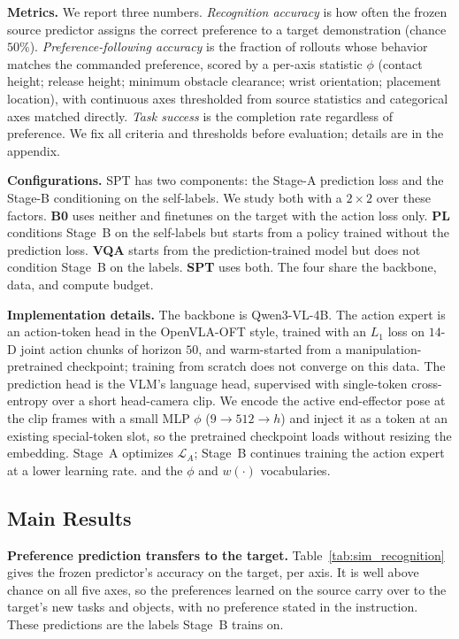 \documentclass{article}
\begin{document}
\textbf{Metrics.}
We report three numbers. \emph{Recognition accuracy} is how often the frozen
source predictor assigns the correct preference to a target demonstration
(chance $50\%$). \emph{Preference-following accuracy} is the fraction of rollouts
whose behavior matches the commanded preference, scored by a per-axis statistic
$\phi$ (contact height; release height; minimum obstacle clearance; wrist
orientation; placement location), with continuous axes thresholded from source
statistics and categorical axes matched directly. \emph{Task success} is the
completion rate regardless of preference. We fix all criteria and thresholds
before evaluation; details are in the appendix.


\textbf{Configurations.}
SPT has two components: the Stage-A prediction loss and the Stage-B conditioning
on the self-labels. We study both with a $2\times2$ over these factors.
\textbf{B0} uses neither and finetunes on the target with the action loss only.
\textbf{PL} conditions Stage~B on the self-labels but starts from a policy
trained without the prediction loss. \textbf{VQA} starts from the
prediction-trained model but does not condition Stage~B on the labels.
\textbf{SPT} uses both. The four share the backbone, data, and compute budget.

\textbf{Implementation details.}
The backbone is Qwen3-VL-4B. The action expert is an action-token head in the
OpenVLA-OFT style, trained with an $L_1$ loss on $14$-D joint action chunks of
horizon $50$, and warm-started from a manipulation-pretrained checkpoint;
training from scratch does not converge on this data. The prediction head is the
VLM's language head, supervised with single-token cross-entropy over a short
head-camera clip. We encode the active end-effector pose at the clip frames with
a small MLP $\phi$ ($9\!\to\!512\!\to\!h$) and inject it as a token at an
existing special-token slot, so the pretrained checkpoint loads without resizing
the embedding. Stage~A optimizes $\mathcal{L}_A$; Stage~B continues training the
action expert at a lower learning rate. 
and the $\phi$ and $w(\cdot)$ vocabularies.



\subsection{Main Results}
\label{sec:exp-main}

\textbf{Preference prediction transfers to the target.}
Table~\ref{tab:sim_recognition} gives the frozen predictor's accuracy on the
target, per axis. It is well above chance on all five axes, so the preferences
learned on the source carry over to the target's new tasks and objects, with no
preference stated in the instruction. These predictions are the labels Stage~B
trains on.
\end{document}
